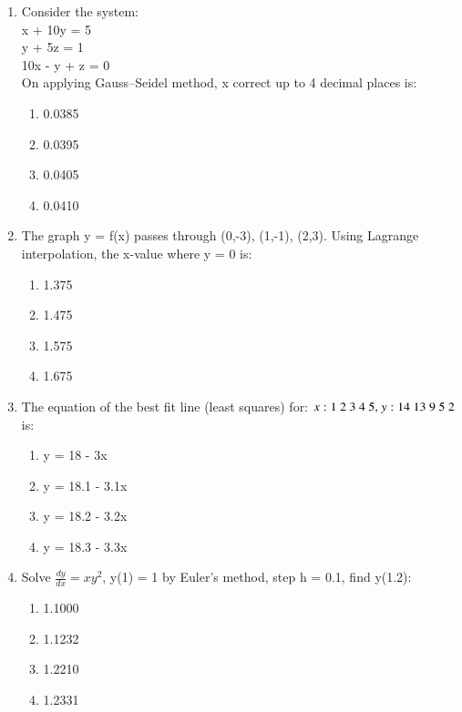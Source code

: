 \documentclass[journal,cmex10]{IEEEtran}
\theoremstyle{remark}
\numberwithin{equation}{enumi}
\numberwithin{figure}{enumi}
\begin{document}
\begin{enumerate}[label=\arabic*)]
    \item Consider the system:\\ x + 10y = 5 \\ y + 5z = 1 \\ 10x - y + z = 0\\ On applying Gauss–Seidel method, x correct up to 4 decimal places is:
    \bigskip
    \hfill {}
    \begin{enumerate}[label=\alph*)]
        \item 0.0385
        \item 0.0395
        \item 0.0405
        \item 0.0410
    \end{enumerate}
    \bigskip

    \item The graph y = f(x) passes through (0,-3), (1,-1), (2,3). Using Lagrange interpolation, the x-value where y = 0 is:
    \bigskip
    \hfill {}
    \begin{enumerate}[label=\alph*)]
        \item 1.375
        \item 1.475
        \item 1.575
        \item 1.675
    \end{enumerate}
    \newpage

    \item The equation of the best fit line (least squares) for: $x: 1\ 2\ 3\ 4\ 5 \), \( y: 14\ 13\ 9\ 5\ 2 $ is:
    \bigskip
    \hfill {}
    \begin{enumerate}[label=\alph*)]
        \item y = 18 - 3x
        \item y = 18.1 - 3.1x
        \item y = 18.2 - 3.2x
        \item y = 18.3 - 3.3x
    \end{enumerate}
    \bigskip

    \item Solve $\frac{dy}{dx} = xy^2$, y(1) = 1 by Euler's method, step h = 0.1, find y(1.2):
    \bigskip
    \hfill {}
    \begin{enumerate}[label=\alph*)]
        \item 1.1000
        \item 1.1232
        \item 1.2210
        \item 1.2331
    \end{enumerate}
    \bigskip


\end{enumerate}
\end{document}
